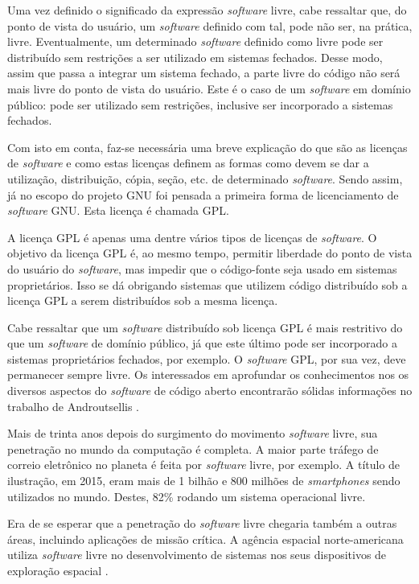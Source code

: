Uma vez definido o significado da expressão \textit{software} livre, cabe ressaltar que, do ponto de
vista do usuário, um \textit{software} definido com tal, pode não ser, na prática, livre.
Eventualmente, um determinado \textit{software} definido como livre pode ser distribuído sem
restrições a ser utilizado em sistemas
fechados. Desse modo, assim que passa a integrar um sistema fechado, a parte livre do código não será mais livre do ponto de vista do usuário. Este é o caso de um \textit{software} em domínio público: pode ser utilizado sem restrições, inclusive ser incorporado a sistemas fechados.

Com isto em conta, faz-se necessária uma breve explicação do que são as licenças
de \textit{software} e como estas licenças definem as formas como devem se dar a utilização, distribuição, cópia, seção, etc. de determinado \textit{software}. Sendo assim,
já no escopo do projeto GNU \cite{Stallman1985} foi pensada a primeira forma
de licenciamento de \textit{software}
GNU. Esta licença é chamada GPL.

A licença GPL é apenas uma dentre vários tipos de licenças de \textit{software}.
O objetivo da licença GPL é, ao mesmo tempo, permitir liberdade do ponto de vista
do usuário do \textit{software}, mas impedir que o código-fonte seja usado em sistemas proprietários. Isso se dá obrigando sistemas que utilizem código
distribuído sob a licença GPL a serem distribuídos sob a mesma licença.

Cabe ressaltar que um \textit{software} distribuído sob licença GPL é mais restritivo do
que um \textit{software} de domínio público, já que este último pode ser incorporado
a sistemas proprietários fechados, por exemplo. O \textit{software} GPL, por sua vez,
deve permanecer sempre livre. Os interessados em aprofundar os conhecimentos nos
os diversos aspectos do \textit{software} de código aberto encontrarão sólidas informações
no trabalho de Androutsellis \cite{Androutsellis2010}.

Mais de trinta anos depois do surgimento do movimento \textit{software} livre,
sua penetração no mundo da computação é completa. A maior parte tráfego de correio
eletrônico no planeta é feita por \textit{software} livre, por exemplo.  A título
de ilustração, em 2015, eram mais de 1 bilhão e 800 milhões de \textit{smartphones}
sendo utilizados no mundo. Destes, 82\% rodando um sistema operacional livre.

Era de se esperar que a penetração do \textit{software} livre chegaria também a outras
áreas, incluindo aplicações de missão crítica. A agência espacial norte-americana
utiliza \textit{software} livre no desenvolvimento de sistemas nos seus dispositivos
de exploração espacial \cite{Norris2004}.

